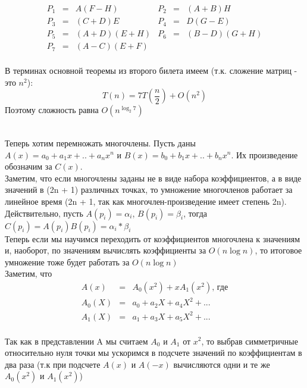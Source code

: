 \begin{equation*}
\begin{array}{llllll}
P_1 &=& A(F - H) & P_2 &=& (A + B)H \\
P_3 &=& (C + D)E & P_4 &=& D(G - E) \\
P_5 &=& (A + D)(E + H) & P_6 &=& (B - D)(G + H) \\
P_7 &=& (A - C)(E + F) &  \\
\end{array}
\end{equation*}

\noindent В терминах основной теоремы из второго билета имеем (т.к. сложение матриц - это $n^2$):
$$
T(n) = 7T(\frac{n}{2}) + O(n^2)
$$
\noindent Поэтому сложность равна $O(n^{\log_2 7})$

 \\
Теперь хотим перемножать многочлены. Пусть даны $A(x) = a_0 + a_1 x + .. + a_n x^n$ и $B(x) = b_0 + b_1 x + .. + b_n x^n$. Их произведение обозначим за $C(x).$ \\

\noindent Заметим, что если многочлены заданы не в виде набора коэффициентов, а в виде значений в (2n + 1) различных точках, то умножение многочленов работает за линейное время (2n + 1, так как многочлен-произведение имеет степень 2n). Действительно, пусть $A(p_i) = \alpha_i$, $B(p_i) = \beta_i$, тогда $C(p_i) = A(p_i) B(p_i) = \alpha_i * \beta_i$ \\

\noindent Теперь если мы научимся переходить от коэффициентов многочлена к значениям и, наоборот, по значениям вычислять коэффициенты за $O(n \log n)$, то итоговое умножение тоже будет работать за $O(n \log n)$ \\

\noindent Заметим, что
\begin{equation*}
\begin{array}{lll}
A(x) &=& A_0(x^2) + x A_1(x^2)\text{, где} \\
A_0(X) &=& a_0 + a_2 X + a_4 X^2 + ... \\
A_1(X) &=& a_1 + a_3 X + a_5 X^2 + ...
\end{array}
\end{equation*} \\

\noindent Так как в представлении A мы считаем $A_0$ и $A_1$ от $x^2$, то выбрав симметричные относительно нуля точки мы ускоримся в подсчете значений по коэффициентам в два раза (т.к при подсчете $A(x)$ и $A(-x)$ вычисляются одни и те же $A_0(x^2)$ и $A_1(x^2)$) \\

